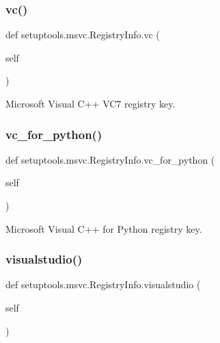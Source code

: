 \subsubsection{\texorpdfstring{vc()}{vc()}}
{\footnotesize\ttfamily def setuptools.\+msvc.\+Registry\+Info.\+vc (\begin{DoxyParamCaption}\item[{}]{self }\end{DoxyParamCaption})}

\begin{DoxyVerb}Microsoft Visual C++ VC7 registry key.
\end{DoxyVerb}
 \mbox{\label{classsetuptools_1_1msvc_1_1_registry_info_a0b3312fb81aa1413b38c3b334330e008}} 
\subsubsection{\texorpdfstring{vc\+\_\+for\+\_\+python()}{vc\_for\_python()}}
{\footnotesize\ttfamily def setuptools.\+msvc.\+Registry\+Info.\+vc\+\_\+for\+\_\+python (\begin{DoxyParamCaption}\item[{}]{self }\end{DoxyParamCaption})}

\begin{DoxyVerb}Microsoft Visual C++ for Python registry key.
\end{DoxyVerb}
 \mbox{\label{classsetuptools_1_1msvc_1_1_registry_info_a0b1853b483f8b7be15c5eb2ee344d856}} 
\subsubsection{\texorpdfstring{visualstudio()}{visualstudio()}}
{\footnotesize\ttfamily def setuptools.\+msvc.\+Registry\+Info.\+visualstudio (\begin{DoxyParamCaption}\item[{}]{self }\end{DoxyParamCaption})}

